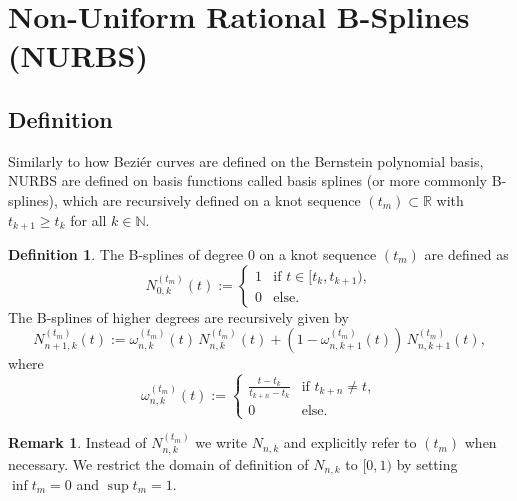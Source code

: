 \documentclass[a4paper, 11pt]{report}
\theoremstyle{definition}
\newtheorem{definition}{Definition}[section]
\newtheorem*{remark}{Remark}
\begin{document}
\section{Non-Uniform Rational B-Splines (NURBS)}
\subsection{Definition}
Similarly to how Beziér curves are defined on the Bernstein polynomial basis, NURBS are defined on basis functions called basis splines (or more commonly B-splines), which are recursively defined on a knot sequence $(t_m) \subset \mathbb{R}$ with $t_{k+1} \geq t_k$ for all $k \in \mathbb{N}$.

\begin{definition}
	The B-splines of degree $0$ on a knot sequence $(t_m)$ are defined as
	\begin{equation}
		N^{(t_m)}_{0,k}(t) :=
		\begin{cases}
			1 & \text{if } t \in [t_k, t_{k+1}),\\
			0 & \text{else.}
		\end{cases}
	\end{equation}
	The B-splines of higher degrees are recursively given by
	\begin{equation}
		N_{n+1,k}^{(t_m)}(t) := \omega^{(t_m)}_{n, k}(t) \, N^{(t_m)}_{n, k}(t) + (1-\omega^{(t_m)}_{n, k+1}(t)) \, N^{(t_m)}_{n, k+1}(t),
	\end{equation}
	where
	\begin{equation}
		\omega^{(t_m)}_{n,k}(t) := 
		\begin{cases}
			\frac{t-t_k}{t_{k+n} - t_k} &\text{if } t_{k+n} \neq t,\\
			0 							&\text{else.}
		\end{cases}
	\end{equation}
\end{definition}

\begin{remark}
	Instead of $N_{n,k}^{(t_m)}$ we write $N_{n,k}$ and explicitly refer to $(t_m)$ when necessary. We restrict the domain of definition of $N_{n,k}$ to $[0, 1)$ by setting $\inf t_m = 0$ and $\sup t_m = 1$.
\end{remark}
\end{document}
